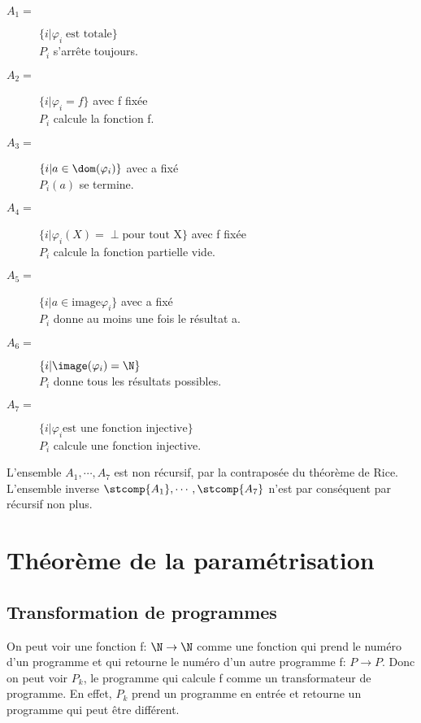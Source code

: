 \begin{description}
	\item[$A_1 =$] $\{i| \varphi_i \; \text{est totale}\}$ \\
	 				$P_i$ s'arrête toujours.
	\item[$A_2 =$] $\{i| \varphi_i = f\}$ avec f fixée \\
					$P_i$ calcule la fonction f.
	\item[$A_3 =$] $\{i| a \in \dom(\varphi_i)\}$ avec a fixé \\
					$P_i(a)$ se termine.
	\item[$A_4 =$] $\{i| \varphi_i(X) = \perp \text{pour tout X}\}$ avec f fixée \\
					$P_i$ calcule la fonction partielle vide.
	\item[$A_5 =$] $\{i| a \in \text{image}\varphi_i\}$ avec a fixé \\
					$P_i$ donne au moins une fois le résultat a.
	\item[$A_6 =$] $\{i| \image(\varphi_i) = \N\}$ \\
					$P_i$ donne tous les résultats possibles.
	\item[$A_7 =$] $\{i| \varphi_i \text{est une fonction injective}\}$ \\
					$P_i$ calcule une fonction injective.
\end{description}

L'ensemble $A_1, \cdots, A_7$ est non récursif, par la contraposée du théorème de Rice. L'ensemble inverse $\stcomp{A_1}, \cdots, \stcomp{A_7}$ n'est par conséquent par récursif non plus.


\section{Théorème de la paramétrisation}
\label{sec:th_or_me_de_la_param_trisation}

\subsection{Transformation de programmes}
\label{sub:transformation_de_programmes}
\begin{mydef}
	On peut voir une fonction f: $\N \rightarrow \N$ comme une fonction qui prend
	le numéro d'un programme et qui retourne le numéro d'un autre programme f: $P
	\rightarrow P$. Donc on peut voir $P_k$, le programme qui calcule f comme un
	transformateur de programme. En effet, $P_k$ prend un programme en entrée et
	retourne un programme qui peut être différent.
\end{mydef}

